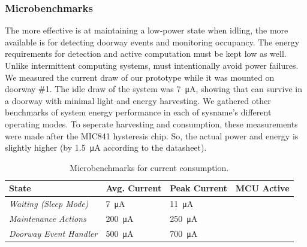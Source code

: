 \subsubsection{Microbenchmarks}
\label{sec:microbenchmarks}
The more effective \sysname is at maintaining a low-power state when idling, the more available \sysname is for detecting doorway events and monitoring occupancy.
The energy requirements for detection and active computation must be kept low as well.
Unlike intermittent computing systems, \sysname must intentionally avoid power failures.
We measured the current draw of our \sysname prototype while it was mounted on doorway \#1.
The idle draw of the system was \SI{7}{\micro\ampere}, showing that \sysname can survive in a doorway with minimal light and energy harvesting.
We gathered other benchmarks of system energy performance in each of sysname's different operating modes. To seperate harvesting and consumption, these measurements were made after the MIC841 hysteresis chip. So, the actual power and energy is slightly higher (by \SI{1.5}{\micro\ampere} according to the datasheet).


%
\begin{table}[t]
\centering
\footnotesize
\begin{tabular}{@{}p{1.4in}llc@{}}
\toprule
\textbf{State}          & \multicolumn{1}{r}{\textbf{Avg. Current}} & \multicolumn{1}{r}{\textbf{Peak Current}} & \multicolumn{1}{r}{\textbf{MCU Active}} \\ \midrule
\textit{Waiting (Sleep Mode)}       	& \SI{7}{\micro\ampere}	&  \SI{11}{\micro\ampere}	& \textcolor{magenta}{\xmark} \\
\textit{Maintenance Actions} & \SI{200}{\micro\ampere}	& \SI{250}{\micro\ampere}		 & \textcolor{green}{\cmark} \\
\textit{Doorway Event Handler} & \SI{500}{\micro\ampere}	& \SI{700}{\micro\ampere}	    & \textcolor{green}{\cmark} \\ \midrule
\end{tabular}
\caption{Microbenchmarks for \sysname current consumption.}
\label{tab:microbenchmarks}
\end{table}


